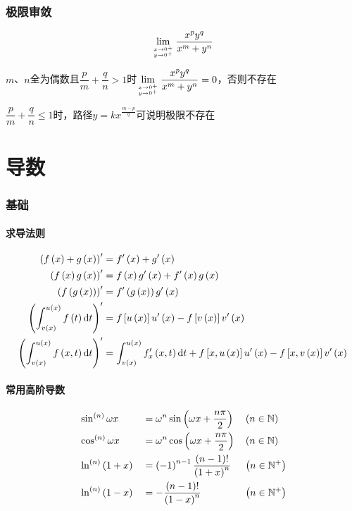 \documentclass{article}
\begin{document}
\section{极限审敛}

\[\lim_{x\to0^+\atop y\to0^+}\frac{x^py^q}{x^m+y^n}\]

$m$、$n$全为偶数且$\dfrac pm+\dfrac qn>1$时$\lim\limits_{x\to0^+\atop y\to0^+}\dfrac{x^py^q}{x^m+y^n}=0$，否则不存在

$\dfrac pm+\dfrac qn\leqslant1$时，路径$y=kx^{\frac{m-p}q}$可说明极限不存在

\part{导数}

\section{基础}

\subsection{求导法则}

\[\begin{aligned}
        \left(f\left(x\right)+g\left(x\right)\right)^\prime                      & =f^\prime\left(x\right)+g^\prime\left(x\right)                                         \\
        \left(f\left(x\right)g\left(x\right)\right)^\prime                       & =f\left(x\right)g^\prime\left(x\right)+f^\prime\left(x\right)g\left(x\right)                             \\
        \left(f\left(g\left(x\right)\right)\right)^\prime                        & =f^\prime\left(g\left(x\right)\right)g^\prime\left(x\right)                                     \\
        \left(\int_{v\left(x\right)}^{u\left(x\right)}f\left(t\right)\mathrm d t\right)^\prime   & =f\left[u\left(x\right)\right]u^\prime\left(x\right)-f\left[v\left(x\right)\right]v^\prime\left(x\right) \\
        \left(\int_{v\left(x\right)}^{u\left(x\right)}f\left(x,t\right)\mathrm d t\right)^\prime & =\int_{v\left(x\right)}^{u\left(x\right)}f_x^\prime\left(x,t\right)\mathrm d t
        +f\left[x,u\left(x\right)\right]u^\prime\left(x\right)-f\left[x,v\left(x\right)\right]v^\prime\left(x\right)
    \end{aligned}\]

\subsection{常用高阶导数}

\[\begin{aligned}
         & \sin^{\left(n\right)}\omega x &  & =\omega^n\sin\left(\omega x+\frac{n\pi}2\right)   &  & \left(n\in\mathbb N\right)  \\
         & \cos^{\left(n\right)}\omega x &  & =\omega^n\cos{\left(\omega x+\frac{n\pi}2\right)} &  & \left(n\in\mathbb N\right)  \\
         & \ln^{\left(n\right)}\left(1+x\right)   &  & =\left(-1\right)^{n-1}\frac{\left(n-1\right)!}{\left(1+x\right)^n}  &  & \left(n\in\mathbb N^+\right) \\
         & \ln^{\left(n\right)}\left(1-x\right)   &  & =-\frac{\left(n-1\right)!}{\left(1-x\right)^n}             &  & \left(n\in\mathbb N^+\right) \\
    \end{aligned}\]
\end{document}
